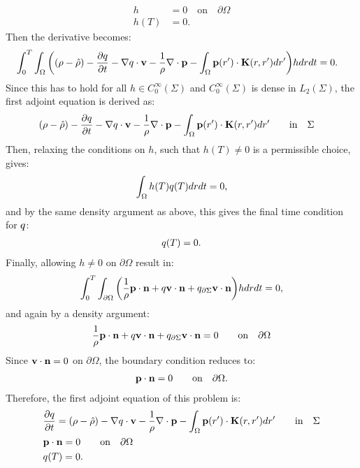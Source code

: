 \begin{align*}
h&=0 \quad \text{on} \quad \partial \Omega\\
h(T)&=0.
\end{align*}
Then the derivative becomes:
\begin{align*}
 &\int_0^T \int_\Omega \bigg((\rho - \hat {\rho}) - \frac{\partial q}{\partial t} - \nabla q \cdot \mathbf{v} -\frac{1}{\rho} \nabla\cdot \mathbf{p}  -  \int_\Omega  \mathbf{p}(r') \cdot\mathbf{K}(r,r')   dr'  \bigg)hdr dt =0.
\end{align*}
Since this has to hold for all $h \in C_0^\infty(\Sigma)$ and $C_0^\infty(\Sigma)$ is dense in $L_2(\Sigma)$, the first adjoint equation is derived as:
\begin{align}
&(\rho - \hat {\rho}) - \frac{\partial q}{\partial t} - \nabla q \cdot \mathbf{v} -\frac{1}{\rho} \nabla\cdot \mathbf{p}  -  \int_\Omega  \mathbf{p}(r') \cdot\mathbf{K}(r,r')   dr'  \qquad \text{in} \quad \Sigma \notag
\end{align}
Then, relaxing the conditions on $h$, such that $h(T) \neq 0$ is a permissible choice, gives:
\begin{align*}
\int_\Omega h(T) q(T) dr dt=0,
\end{align*}
and by the same density argument as above, this gives the final time condition for $q$:
\begin{align*}
q(T) = {0} .
\end{align*}
Finally, allowing $h \neq 0$ on $\partial\Omega$ result in:
\begin{align*}
\int_0^T \int_{\partial \Omega} \bigg(\frac{1}{\rho} \mathbf{p} \cdot \mathbf{n} +  q \mathbf{v} \cdot \mathbf{n}   +{q}_{\partial \Sigma} \mathbf{v} \cdot \mathbf{n}\bigg)h  dr dt=0,
\end{align*}
and again by a density argument:
\begin{align*}
 \frac{1}{\rho} \mathbf{p} \cdot \mathbf{n}  +  q \mathbf{v} \cdot \mathbf{n}   +{q}_{\partial \Sigma} \mathbf{v} \cdot \mathbf{n} = 0\qquad \text{on} \quad \partial \Omega
\end{align*}
Since $\mathbf{v} \cdot \mathbf{n} =0$ on $ \partial\Omega$, the boundary condition reduces to:
\begin{align*}
\mathbf{p} \cdot \mathbf{n} = 0 \qquad \text{on} \quad \partial\Omega.
\end{align*}
Therefore, the first adjoint equation of this problem is:
\begin{align*}
&  \frac{\partial q}{\partial t}  = (\rho - \hat {\rho})- \nabla q \cdot \mathbf{v} -\frac{1}{\rho} \nabla\cdot \mathbf{p}  -  \int_\Omega  \mathbf{p}(r') \cdot\mathbf{K}(r,r')   dr'  \qquad \text{in} \quad \Sigma \\
& \mathbf{p} \cdot \mathbf{n} = 0 \qquad \text{on} \quad \partial\Omega\\
 &q(T) = {0} .
\end{align*}
